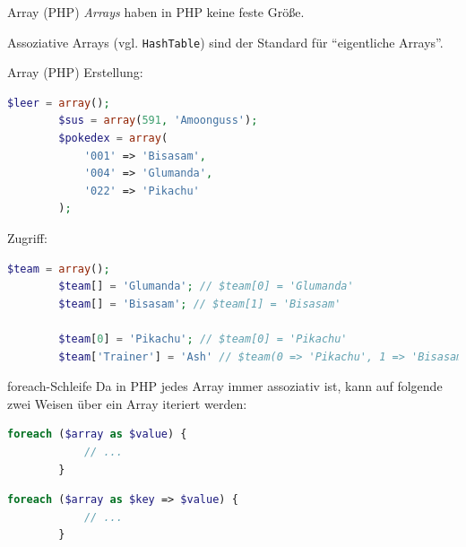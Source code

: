 \begin{defi}{Array (PHP)}
    \emph{Arrays} haben in PHP keine feste Größe.

    Assoziative Arrays (vgl. \texttt{HashTable}) sind der Standard für \enquote{eigentliche Arrays}.
\end{defi}

\begin{example}{Array (PHP)}
    Erstellung:
    \begin{lstlisting}[language=php]
        $leer = array();
        $sus = array(591, 'Amoonguss');
        $pokedex = array(
            '001' => 'Bisasam',
            '004' => 'Glumanda',
            '022' => 'Pikachu'
        ); 
    \end{lstlisting}

    Zugriff:
    \begin{lstlisting}[language=php]
        $team = array();
        $team[] = 'Glumanda'; // $team[0] = 'Glumanda'
        $team[] = 'Bisasam'; // $team[1] = 'Bisasam'

        $team[0] = 'Pikachu'; // $team[0] = 'Pikachu'
        $team['Trainer'] = 'Ash' // $team(0 => 'Pikachu', 1 => 'Bisasam', 'Trainer' => 'Ash')
    \end{lstlisting}
\end{example}

\begin{bonus}{foreach-Schleife}
    Da in PHP jedes Array immer assoziativ ist, kann auf folgende zwei Weisen über ein Array iteriert werden:

    \begin{lstlisting}[language=php]
        foreach ($array as $value) {
            // ...
        }
    \end{lstlisting}

    \begin{lstlisting}[language=php]
        foreach ($array as $key => $value) {
            // ...
        }
    \end{lstlisting}
\end{bonus}

